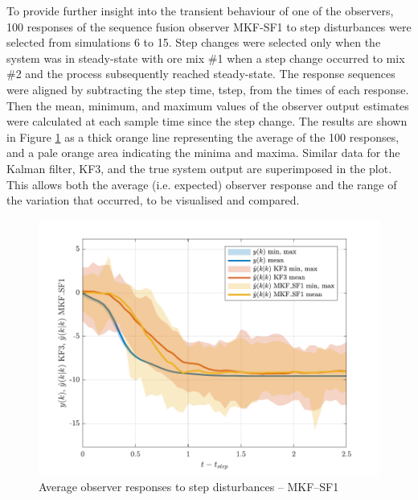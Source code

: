 To provide further insight into the transient behaviour of one of the observers, 100 responses of the sequence fusion observer MKF-SF1 to step disturbances were selected from simulations 6 to 15. Step changes were selected only when the system was in steady-state with ore mix \#1 when a step change occurred to mix \#2 and the process subsequently reached steady-state. The response sequences were aligned by subtracting the step time, \gls{tstep}, from the times of each response. Then the mean, minimum, and maximum values of the observer output estimates were calculated at each sample time since the step change. The results are shown in Figure \ref{fig:sim_resp_plot_MKF_SF1} as a thick orange line representing the average of the 100 responses, and a pale orange area indicating the minima and maxima. Similar data for the Kalman filter, KF3, and the true system output are superimposed in the plot. This allows both the average (i.e. expected) observer response and the range of the variation that occurred, to be visualised and compared.
\begin{figure}[htp]
	\centering
	\includegraphics[width=13cm]{images/grind1_rod_obs_sim_resp_plot1_MKF_SF1.pdf}
	\caption{Average observer responses to step disturbances -- MKF--SF1}
	\label{fig:sim_resp_plot_MKF_SF1}
\end{figure}
